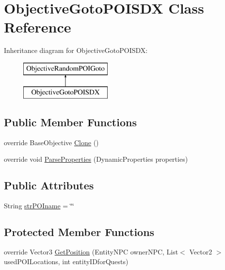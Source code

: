 \hypertarget{class_objective_goto_p_o_i_s_d_x}{}\section{Objective\+Goto\+P\+O\+I\+S\+DX Class Reference}
\label{class_objective_goto_p_o_i_s_d_x}
Inheritance diagram for Objective\+Goto\+P\+O\+I\+S\+DX\+:\begin{figure}[H]
\begin{center}
\leavevmode
\includegraphics[height=2.000000cm]{d0/d27/class_objective_goto_p_o_i_s_d_x}
\end{center}
\end{figure}
\subsection*{Public Member Functions}
\begin{DoxyCompactItemize}
\item 
override Base\+Objective \mbox{\hyperlink{class_objective_goto_p_o_i_s_d_x_aab74c80adfb026d8cc2ddd2cffeb5266}{Clone}} ()
\item 
override void \mbox{\hyperlink{class_objective_goto_p_o_i_s_d_x_a0e2352c53d7fb7ca6759cc65086fdac4}{Parse\+Properties}} (Dynamic\+Properties properties)
\end{DoxyCompactItemize}
\subsection*{Public Attributes}
\begin{DoxyCompactItemize}
\item 
String \mbox{\hyperlink{class_objective_goto_p_o_i_s_d_x_a3b90272b61bebff67a810abc96172212}{str\+P\+O\+Iname}} = \char`\"{}\char`\"{}
\end{DoxyCompactItemize}
\subsection*{Protected Member Functions}
\begin{DoxyCompactItemize}
\item 
override Vector3 \mbox{\hyperlink{class_objective_goto_p_o_i_s_d_x_a00a64fdf46014806e613fa91f9f2388e}{Get\+Position}} (Entity\+N\+PC owner\+N\+PC, List$<$ Vector2 $>$ used\+P\+O\+I\+Locations, int entity\+I\+Dfor\+Quests)
\end{DoxyCompactItemize}
